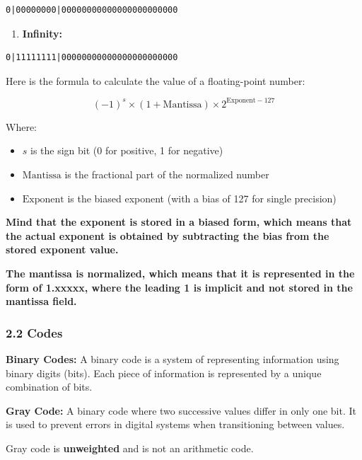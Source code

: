 \documentclass[
  a4paper,
]{article}
\providecommand{\tightlist}{%
  \setlength{\itemsep}{0pt}\setlength{\parskip}{0pt}}
\begin{document}
\begin{verbatim}
0|00000000|00000000000000000000000
\end{verbatim}

\begin{enumerate}
\def\labelenumi{\arabic{enumi}.}
\setcounter{enumi}{1}
\tightlist
\item
  \textbf{Infinity:}
\end{enumerate}

\begin{verbatim}
0|11111111|00000000000000000000000
\end{verbatim}

Here is the formula to calculate the value of a floating-point number:

\[(-1)^s \times (1 + \text{Mantissa}) \times 2^{\text{Exponent} - 127}\]

Where:

\begin{itemize}
\tightlist
\item
  \(s\) is the sign bit (0 for positive, 1 for negative)
\item
  \(\text{Mantissa}\) is the fractional part of the normalized number
\item
  \(\text{Exponent}\) is the biased exponent (with a bias of 127 for
  single precision)
\end{itemize}

\textbf{Mind that the exponent is stored in a biased form, which means
that the actual exponent is obtained by subtracting the bias from the
stored exponent value.}

\textbf{The mantissa is normalized, which means that it is represented
in the form of 1.xxxxx, where the leading 1 is implicit and not stored
in the mantissa field.}

\subsubsection{2.2 Codes}\label{codes}

\textbf{Binary Codes:} A binary code is a system of representing
information using binary digits (bits). Each piece of information is
represented by a unique combination of bits.

\textbf{Gray Code:} A binary code where two successive values differ in
only one bit. It is used to prevent errors in digital systems when
transitioning between values.

Gray code is \textbf{unweighted} and is not an arithmetic code.
\end{document}
